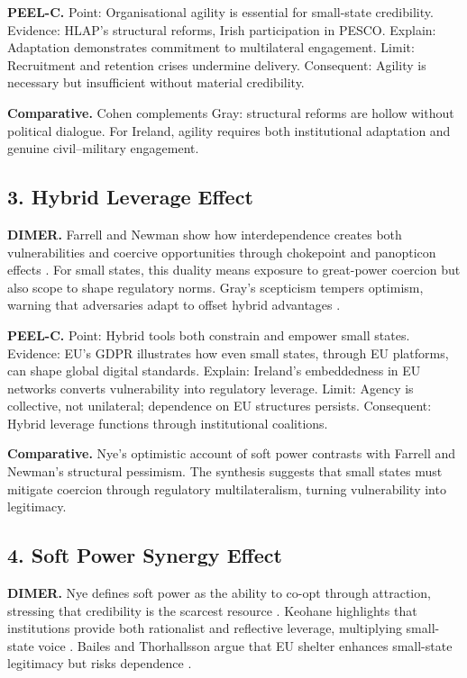 \textbf{PEEL-C.} Point: Organisational agility is essential for small-state credibility. Evidence: HLAP’s structural reforms, Irish participation in PESCO. Explain: Adaptation demonstrates commitment to multilateral engagement. Limit: Recruitment and retention crises undermine delivery. Consequent: Agility is necessary but insufficient without material credibility. 

\textbf{Comparative.} Cohen complements Gray: structural reforms are hollow without political dialogue. For Ireland, agility requires both institutional adaptation and genuine civil–military engagement.

\subsection*{3. Hybrid Leverage Effect}
\textbf{DIMER.} Farrell and Newman show how interdependence creates both vulnerabilities and coercive opportunities through chokepoint and panopticon effects \parencite{FARRELL_2019}. For small states, this duality means exposure to great-power coercion but also scope to shape regulatory norms. Gray’s scepticism tempers optimism, warning that adversaries adapt to offset hybrid advantages \parencite{GRAY_2005}.

\textbf{PEEL-C.} Point: Hybrid tools both constrain and empower small states. Evidence: EU’s GDPR illustrates how even small states, through EU platforms, can shape global digital standards. Explain: Ireland’s embeddedness in EU networks converts vulnerability into regulatory leverage. Limit: Agency is collective, not unilateral; dependence on EU structures persists. Consequent: Hybrid leverage functions through institutional coalitions. 

\textbf{Comparative.} Nye’s optimistic account of soft power contrasts with Farrell and Newman’s structural pessimism. The synthesis suggests that small states must mitigate coercion through regulatory multilateralism, turning vulnerability into legitimacy.

\subsection*{4. Soft Power Synergy Effect}
\textbf{DIMER.} Nye defines soft power as the ability to co-opt through attraction, stressing that credibility is the scarcest resource \parencite{NYE_2008}. Keohane highlights that institutions provide both rationalist and reflective leverage, multiplying small-state voice \parencite{KEOHANE_1988}. Bailes and Thorhallsson argue that EU shelter enhances small-state legitimacy but risks dependence \parencite{BAILES_2013}. 

